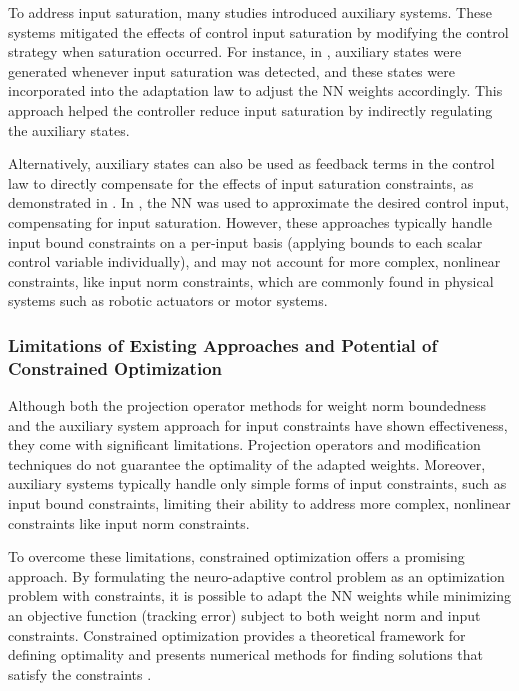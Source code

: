\documentclass[lettersize,journal]{IEEEtran}
\begin{document}
To address input saturation, many studies introduced auxiliary systems. 
These systems mitigated the effects of control input saturation by modifying the control strategy when saturation occurred. 
For instance, in \cite{Esfandiari:2014aa,Karason:1994aa,Esfandiari:2015aa}, auxiliary states were generated whenever input saturation was detected, and these states were incorporated into the adaptation law to adjust the NN weights accordingly. 
This approach helped the controller reduce input saturation by indirectly regulating the auxiliary states.

Alternatively, auxiliary states can also be used as feedback terms in the control law to directly compensate for the effects of input saturation constraints, as demonstrated in \cite{Arefinia:2020aa,He:2016aa,Peng:2020aa}. 
In \cite{Gao:2006aa}, the NN was used to approximate the desired control input, compensating for input saturation. 
However, these approaches typically handle input bound constraints on a per-input basis (\ie applying bounds to each scalar control variable individually), and may not account for more complex, nonlinear constraints, like input norm constraints, which are commonly found in physical systems such as robotic actuators or motor systems.

\subsubsection{Limitations of Existing Approaches and Potential of Constrained Optimization}

Although both the projection operator methods for weight norm boundedness and the auxiliary system approach for input constraints have shown effectiveness, they come with significant limitations. 
Projection operators and modification techniques do not guarantee the optimality of the adapted weights. 
Moreover, auxiliary systems typically handle only simple forms of input constraints, such as input bound constraints, limiting their ability to address more complex, nonlinear constraints like input norm constraints.

To overcome these limitations, constrained optimization offers a promising approach. 
By formulating the neuro-adaptive control problem as an optimization problem with constraints, it is possible to adapt the NN weights while minimizing an objective function (\eg tracking error) subject to both weight norm and input constraints. 
Constrained optimization provides a theoretical framework for defining optimality and presents numerical methods for finding solutions that satisfy the constraints \cite{Nocedal:2006aa}.
\end{document}
